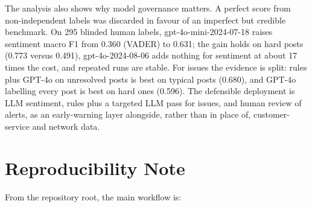 \documentclass[11pt,a4paper]{article}
\begin{document}
The analysis also shows why model governance matters. A perfect score from non-independent labels was discarded in favour of an imperfect but credible benchmark. On 295 blinded human labels, gpt-4o-mini-2024-07-18 raises sentiment macro F1 from 0.360 (VADER) to 0.631; the gain holds on hard posts (0.773 versus 0.491), gpt-4o-2024-08-06 adds nothing for sentiment at about 17 times the cost, and repeated runs are stable. For issues the evidence is split: rules plus GPT-4o on unresolved posts is best on typical posts (0.680), and GPT-4o labelling every post is best on hard ones (0.596). The defensible deployment is LLM sentiment, rules plus a targeted LLM pass for issues, and human review of alerts, as an early-warning layer alongside, rather than in place of, customer-service and network data.

\section*{Reproducibility Note}

From the repository root, the main workflow is:
\end{document}
